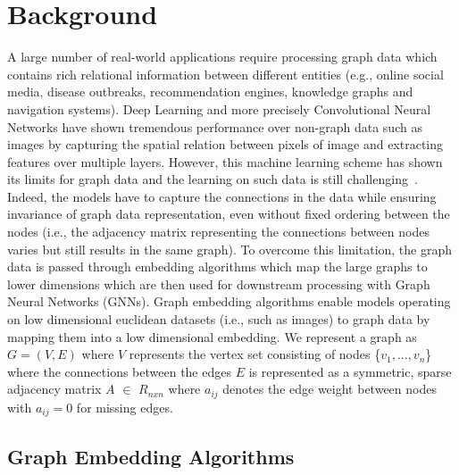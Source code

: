 \section{Background}\label{background}

A large number of real-world applications require processing graph data which contains rich relational information between different entities (e.g., online social media, disease outbreaks, recommendation engines, knowledge graphs and navigation systems).
Deep Learning and more precisely Convolutional Neural Networks have shown tremendous performance over non-graph data such as images by capturing the spatial relation between pixels of image and extracting features over multiple layers.
However, this machine learning scheme has shown its limits for graph data and the learning on such data is still challenging~\cite{zhou2018graph}.
Indeed, the models have to capture the connections in the data while ensuring invariance of graph data representation, even without fixed ordering between the nodes (i.e., the adjacency matrix representing the connections between nodes varies but still results in the same graph). %
To overcome this limitation, the graph data is passed through embedding algorithms which map the large graphs to lower dimensions which are then used for downstream processing with Graph Neural Networks (GNNs).
Graph embedding algorithms enable models operating on low dimensional euclidean datasets (i.e., such as images) to graph data by mapping them into a low dimensional embedding.
We represent a graph as $G=(V,E)$ where $V$ represents the vertex set consisting of nodes \{$v_1,...,v_n$\} where the connections between the edges $E$ is represented as a symmetric, sparse adjacency matrix $A$ $\in$ $R_{nxn}$ where $a_{ij}$ denotes the edge weight between nodes with $a_{ij}= 0$ for missing edges.


\subsection{Graph Embedding Algorithms}

